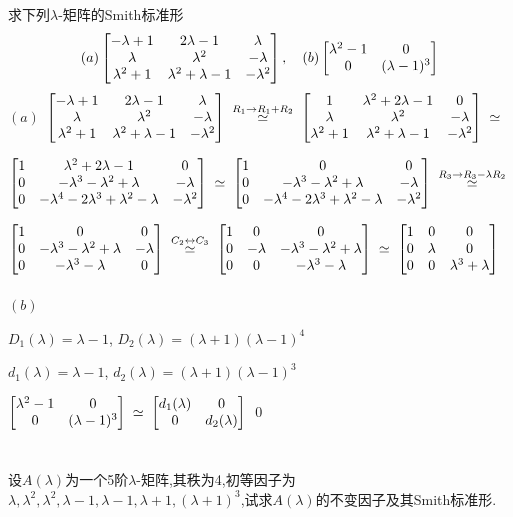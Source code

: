 \documentclass{matrix-homework}
\newcommand{\la}{\lambda}
\newcommand{\simeqstep}[1]{\;\overset{#1}{\simeq}\;}
\newcommand{\rowAdd}[3]{\simeqstep{R_{#1} \to R_{#1}  #2 R_{#3}}}
\newcommand{\colSwap}[2]{\simeqstep{C_{#1} \leftrightarrow C_{#2}}}
\begin{document}

\section{}

\newcommand{\questionA}{
    \mat{-\la+1  & 2\la-1      & \la    \\
        \la      & \la^2       & -\la   \\
        \la^2 +1 & \la^2+\la-1 & -\la^2}
}
\newcommand{\questionB}{\mat{\la^2-1 & 0 \\ 0 & (\la-1)^3}}

求下列$\la$-矩阵的Smith标准形$$(a)\questionA,\quad(b)\questionB$$
\answer
$(a)$
$
    \questionA
    \rowAdd{1}{+}{2}
    \mat{1 & \la^2+2\la-1 & 0\\
        \la & \la^2 & -\la \\
        \la^2+1 & \la^2+\la-1 & -\la^2}
    \simeqstep{}
$

$
    \mat{1 & \la^2+2\la-1 & 0\\
        0 & -\la^3-\la^2+\la & -\la \\
        0 & -\la^4-2\la^3+\la^2-\la & -\la^2}
    \simeqstep{}
    \mat{1 & 0 & 0\\
        0 & -\la^3-\la^2+\la & -\la \\
        0 & -\la^4-2\la^3+\la^2-\la & -\la^2}
    \rowAdd{3}{-\la}{2}
$

$
    \mat{1 & 0 & 0\\
        0 & -\la^3-\la^2+\la & -\la \\
        0 & -\la^3-\la & 0}
    \colSwap{2}{3}
    \mat{1 & 0 & 0\\
        0 & -\la & -\la^3-\la^2+\la\\
        0 & 0 & -\la^3-\la}
    \simeqstep{}
    \mat{1 & 0 & 0\\
        0 & \la & 0\\
        0 & 0 & \la^3+\la}
$\\ \\

$(b)$

$D_1(\la) = \la-1$, $D_2(\la) = (\la+1)(\la-1)^4$

$d_1(\la) = \la-1$, $d_2(\la) = (\la+1)(\la-1)^3$

$\questionB \simeqstep{} \mat{d_1(\la) & 0 \\ 0 & d_2(\la)}$
\qed

\section{}
设$A(\la)$为一个5阶$\la$-矩阵,其秩为4,初等因子为$\la,\la^2,\la^2,\la-1,\la-1,\la+1,(\la+1)^3$,试求$A(\la)$的不变因子及其Smith标准形.
\end{document}
